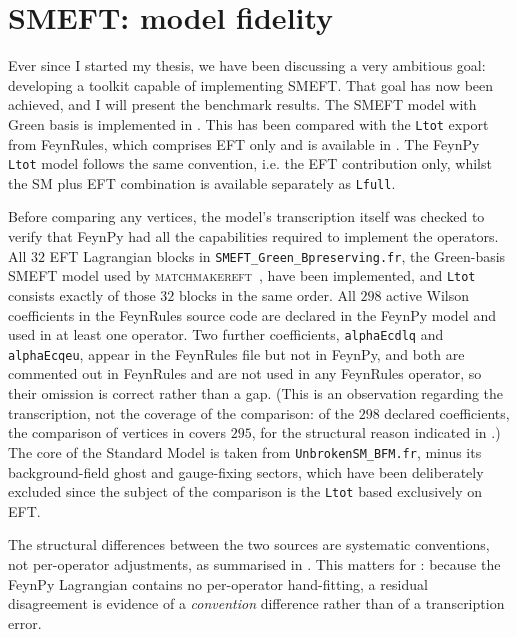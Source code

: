 \section{SMEFT: model fidelity}
\label{sec:validation-fidelity}

Ever since I started my thesis, we have been discussing a very ambitious goal: developing a toolkit capable of implementing SMEFT. That goal has now been achieved, and I will present the benchmark results. The SMEFT model with Green basis is implemented in . This has been compared with the \texttt{Ltot} export from FeynRules, which comprises EFT only and is available in . The FeynPy \texttt{Ltot} model follows the same convention, i.e. the EFT contribution only, whilst the
SM plus EFT combination is available separately as \texttt{Lfull}.


Before comparing any vertices, the model’s transcription itself was checked to verify that FeynPy had all the capabilities required to implement the operators. All $32$ EFT Lagrangian blocks in \texttt{SMEFT\_Green\_Bpreserving.fr}, the Green-basis SMEFT model used by \textsc{matchmakereft}~\cite{Carmona:2021xtq}, have been implemented, and \texttt{Ltot} consists exactly of those $32$ blocks in the same order. All $298$ active Wilson coefficients in the FeynRules source code are declared in the FeynPy model and used in at least one operator. Two further coefficients, \texttt{alphaEcdlq} and \texttt{alphaEcqeu}, appear in the FeynRules file but not in FeynPy, and both are commented out in FeynRules and are not used in any FeynRules operator, so their omission is correct rather than a gap. (This is an observation regarding the transcription, not the coverage of the comparison: of the $298$ declared coefficients, the comparison of vertices in  covers $295$, for the structural reason indicated in .) The core of the Standard Model is taken from \texttt{UnbrokenSM\_BFM.fr}, minus its background-field ghost and gauge-fixing sectors, which have been deliberately excluded since the subject of the comparison is the \texttt{Ltot} based exclusively on EFT.


The structural differences between the two sources are systematic
conventions, not per-operator adjustments, as summarised in
. This matters for
: because the FeynPy Lagrangian contains no
per-operator hand-fitting, a residual disagreement is evidence of a
\emph{convention} difference rather than of a transcription error.

